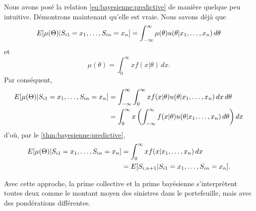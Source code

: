 Nous avons posé la relation \eqref{eq:bayesienne:predictive} de
manière quelque peu intuitive. Démontrons maintenant qu'elle est
vraie. Nous savons déjà que
\begin{equation*}
  E [ \mu(\Theta)|S_{i1} = x_1, \dots, S_{in} = x_n ]
  = \int_{-\infty}^\infty
  \mu(\theta) u(\theta|x_1, \dots, x_n)\, d\theta
\end{equation*}
et
\begin{equation*}
  \mu(\theta) = \int_0^\infty x f(x|\theta)\, dx.
\end{equation*}
Par conséquent,
\begin{align*}
  E [ \mu(\Theta)|S_{i1} = x_1, \dots, S_{in} = x_n ]
  &= \int_{-\infty}^\infty \int_0^\infty
  x f(x|\theta) u(\theta|x_1, \dots, x_n)\, dx\, d\theta \\
  &= \int_0^\infty
  x
  \left(
    \int_{-\infty}^\infty
    f(x|\theta) u(\theta|x_1, \dots, x_n)\, d\theta
  \right)
  dx
\end{align*}
d'où, par le \autoref{thm:bayesienne:predictive},
\begin{align*}
  E [ \mu(\Theta)|S_{i1} = x_1, \dots, S_{in} = x_n ]
  &= \int_0^\infty x f(x|x_1, \dots, x_n)\, dx \\
  &= E [ S_{i, n + 1}|S_{i1} = x_1, \dots, S_{in} = x_n ].
\end{align*}

Avec cette approche, la prime collective et la prime bayésienne
s'interprètent toutes deux comme le montant moyen des sinistres dans
le portefeuille, mais avec des pondérations différentes.

